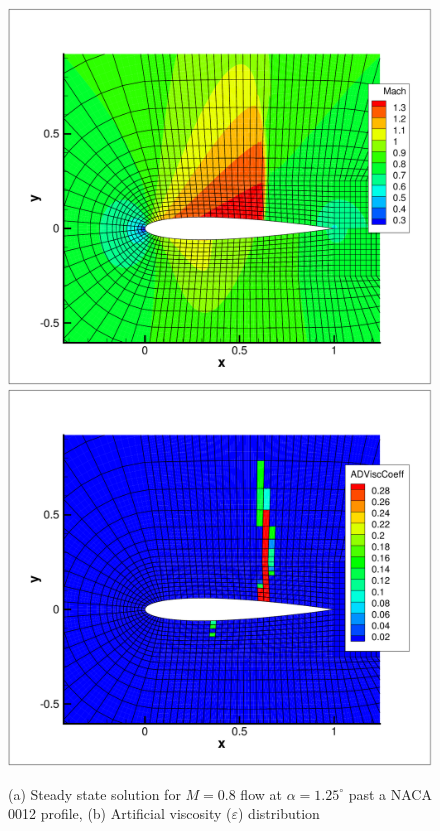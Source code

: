 \begin{figure}[!htbp]
\begin{center}
\includegraphics[width = 0.47 \textwidth]{img/Mach_P4.pdf}
\includegraphics[width = 0.47 \textwidth]{img/ArtVisc_P4.pdf}
\caption{(a) Steady state solution for $M=0.8$ flow at $\alpha = 1.25^\circ$ 
past a NACA 0012 profile, (b) Artificial viscosity ($\varepsilon$) distribution}
\label{fig:}
\end{center}
\end{figure}

